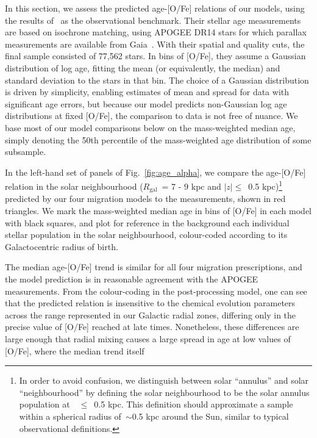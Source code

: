 \documentclass[draft2.tex]{subfiles}
\begin{document}
In this section, we assess the predicted age-[O/Fe] relations of our models, 
using the results of~\citet{Feuillet2019} as the observational benchmark. 
Their stellar age measurements are based on isochrone matching, 
using APOGEE DR14 stars for which parallax measurements are available 
from Gaia~\citep{Abolfathi2014, GaiaDR2}. 
With their spatial and quality cuts, the final sample consisted of 77,562 
stars. 
In bins of [O/Fe], they assume a Gaussian distribution of log age, fitting the 
mean (or equivalently, the median) and standard deviation to the stars in that 
bin. 
The choice of a Gaussian distribution is driven by simplicity, enabling 
estimates of mean and spread for data with significant age errors, but because 
our model predicts non-Gaussian log age distributions at fixed [O/Fe], the 
comparison to data is not free of nuance. 
We base most of our model comparisons below on the mass-weighted median age, 
simply denoting the 50th percentile of the mass-weighted age distribution of 
some subsample. 
\par 
In the left-hand set of panels of Fig.~\ref{fig:age_alpha}, we compare the 
age-[O/Fe] relation in the solar neighbourhood ($R_\text{gal}$~= 7 - 9 kpc and 
$\left|z\right|\leq$~0.5 kpc)\footnote{
	In order to avoid confusion, we distinguish between solar ``annulus'' and 
	solar ``neighbourhood'' by defining the solar neighbourhood to be the 
	solar annulus population at~\absz~$\leq$~0.5 kpc. This definition should 
	approximate a sample within a spherical radius of~$\sim$0.5 kpc around the 
	Sun, similar to typical observational definitions. 
} predicted by our four migration models to the 
\citet{Feuillet2019} measurements, shown in red triangles. 
We mark the mass-weighted median age in bins of [O/Fe] in each model with black 
squares, and plot for reference in the background each individual stellar 
population in the solar neighbourhood, colour-coded according to its 
Galactocentric radius of birth. 
\par 
The median age-[O/Fe] trend is similar for all four migration prescriptions, 
and the model prediction is in reasonable agreement with the APOGEE 
measurements. 
From the colour-coding in the post-processing model, one can see that the 
predicted relation is insensitive to the chemical evolution parameters across 
the range represented in our Galactic radial zones, differing only in the 
precise value of [O/Fe] reached at late times. 
Nonetheless, these differences are large enough that radial mixing causes a 
large spread in age at low values of [O/Fe], where the median trend itself 
\end{document}
